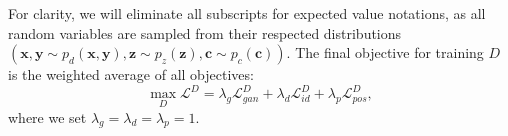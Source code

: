 \documentclass[10pt,journal,compsoc]{IEEEtran}
\begin{document}
For clarity, we will eliminate all subscripts for expected value notations, as all random variables are sampled from their respected distributions $(\mathbf{x} ,\mathbf{y} \sim p_{d}(\mathbf{x},\mathbf{y}), \mathbf{z} \sim p_{z}(\mathbf{z}) , \mathbf{c} \sim p_{c}(\mathbf{c}))$. 
The final objective for training $D$ is the weighted average of all objectives:
\begin{equation}
  \max_{D} \mathcal{L}^{D} = \lambda_{g} \mathcal{L}_{gan}^{D} + \lambda_{d} \mathcal{L}_{id}^{D} +\lambda_{p} \mathcal{L}_{pos}^{D},
\label{eqn:objD}
\end{equation}
where we set $\lambda_{g} = \lambda_{d} = \lambda_{p} = 1$.
\end{document}
